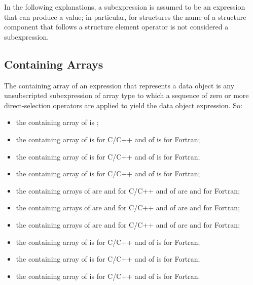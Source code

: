 In the following explanations, a subexpression is assumed to be an expression
that can produce a value; in particular, for structures the name of a structure
component that follows a structure element operator is not considered a
subexpression.

\subsection{Containing Arrays}

The containing array of an expression that represents a data object is any
unsubscripted subexpression of array type to which a sequence of zero or more
direct-selection operators are applied to yield the data object expression. So:

\begin{itemize}
\item the containing array of  is ;

\item the containing array of  is  for C/C++ and of
       is  for Fortran;

\item the containing array of  is  for C/C++ and of
       is  for Fortran;

\item the containing array of  is  for C/C++
      and of  is  for Fortran;

\item the containing arrays of  are  and
       for C/C++ and of  are
       and  for Fortran;

\item the containing arrays of  are  and
       for C/C++ and of  are
       and  for Fortran;

\item the containing arrays of  are  and
       for C/C++ and of  are
       and  for Fortran;

\item the containing array of  is 
      for C/C++ and of  is  for Fortran;

\item the containing array of  is 
      for C/C++ and of  is  for
      Fortran;

\item the containing array of  is
       for C/C++ and of  is
       for Fortran.
\end{itemize}


